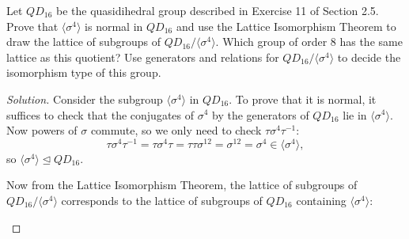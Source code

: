 \documentclass{article}
\begin{document}
Let $QD_{16}$ be the quasidihedral group described in Exercise 11 of Section 2.5. Prove that $\langle \sigma^4 \rangle$ is normal in $QD_{16}$ and use the Lattice Isomorphism Theorem to draw the lattice of subgroups of $QD_{16}/\langle \sigma^4 \rangle$. Which group of order 8 has the same lattice as this quotient? Use generators and relations for $QD_{16}/\langle \sigma^4 \rangle$ to decide the isomorphism type of this group.

\begin{proof}[Solution]
    Consider the subgroup $\langle \sigma^4 \rangle$ in $QD_{16}$. To prove that it is normal, it suffices to check that the conjugates of $\sigma^4$ by the generators of $QD_{16}$ lie in $\langle \sigma^4 \rangle$. Now powers of $\sigma$ commute, so we only need to check $\tau \sigma^4 \tau^{-1}$:
    \begin{equation*}
        \tau \sigma^4 \tau^{-1} = \tau \sigma^4 \tau = \tau \tau \sigma^{12} = \sigma^{12} = \sigma^4 \in \langle \sigma^4 \rangle,
    \end{equation*}
    so $\langle \sigma^4 \rangle \unlhd QD_{16}$.

    Now from the Lattice Isomorphism Theorem, the lattice of subgroups of $QD_{16}/\langle \sigma^4 \rangle$ corresponds to the lattice of subgroups of $QD_{16}$ containing $\langle \sigma^4 \rangle$:

    \begin{center}
\end{center}
\end{proof}
\end{document}
